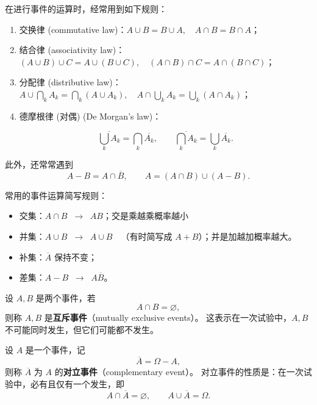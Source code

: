 在进行事件的运算时，经常用到如下规则：
\begin{enumerate}
  \item[(1)] 交换律 (commutative law)：$A \cup B = B \cup A,\quad A \cap B = B \cap A$；
  \item[(2)] 结合律 (associativity law)：$(A \cup B)\cup C = A \cup (B \cup C), \quad (A \cap B)\cap C = A \cap (B \cap C)$；
  \item[(3)] 分配律 (distributive law)：$A \cup \bigcap_k A_k = \bigcap_k (A \cup A_k), \quad A \cap \bigcup_k A_k = \bigcup_k (A \cap A_k)$；
  \item[(4)] 德摩根律 (对偶) (De Morgan’s law)：

  \[
  \overline{\bigcup_k A_k} = \bigcap_k \overline{A_k}, \qquad
  \overline{\bigcap_k A_k} = \bigcup_k \overline{A_k}.
  \]
\end{enumerate}

此外，还常常遇到
\[
A - B = A \cap \overline{B}, \qquad A = (A \cap B) \cup (A - B).
\]
\begin{theorem}
    常用的事件运算简写规则：
\begin{itemize}
  \item 交集：$A \cap B \;\;\to\;\; AB$；交是乘越乘概率越小
  \item 并集：$A \cup B \;\;\to\;\; A \cup B \quad$（有时简写成 $A+B$）；并是加越加概率越大。
  \item 补集：$\overline{A}$ 保持不变；
  \item 差集：$A - B \;\;\to\;\; A\overline{B}$。
\end{itemize}
\end{theorem}
\begin{definition}[互斥事件]
设 $A,B$ 是两个事件，若
\[
A \cap B = \varnothing,
\]
则称 $A,B$ 是\textbf{互斥事件}（mutually exclusive events）。
这表示在一次试验中，$A,B$ 不可能同时发生，但它们可能都不发生。
\end{definition}

\begin{definition}[对立事件]
设 $A$ 是一个事件，记
\[
\overline{A} = \Omega - A,
\]
则称 $\overline{A}$ 为 $A$ 的\textbf{对立事件}（complementary event）。
对立事件的性质是：在一次试验中，必有且仅有一个发生，即
\[
A \cap \overline{A} = \varnothing, 
\qquad 
A \cup \overline{A} = \Omega.
\]
\end{definition}

